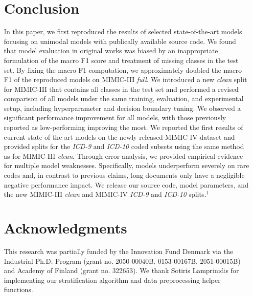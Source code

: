 {\section{Conclusion}
In this paper, we first reproduced the results of selected state-of-the-art models focusing on unimodal models with publically available source code. 
We found that model evaluation in original works was biased by an inappropriate formulation of the macro F1 score and treatment of missing classes in the test set. By fixing the macro F1 computation, we approximately doubled the macro F1 of the reproduced models on MIMIC-III \textit{full}. 
We introduced a new \textit{clean} split for MIMIC-III that contains all classes in the test set and performed a revised comparison of all models under the same training, evaluation, and experimental setup, including hyperparameter and decision boundary tuning. We observed a significant performance improvement for all models, with those previously reported as low-performing improving the most. 
We reported the first results of current state-of-the-art models on the newly released MIMIC-IV dataset \parencite{johnsonMIMICIVFreelyAccessible2023, goldbergerPhysioBankPhysioToolkitPhysioNet2000} and provided splits for the \textit{ICD-9} and \textit{ICD-10} coded subsets using the same method as for MIMIC-III \textit{clean}.
Through error analysis, we provided empirical evidence for multiple model weaknesses. Specifically, models underperform severely on rare codes 
and, in contrast to previous claims, long documents only have a negligible negative performance impact. 
We release our source code, model parameters, and the new MIMIC-III \textit{clean} and MIMIC-IV \textit{ICD-9} and \textit{ICD-10} splits.$^\text{1}$

\section*{Acknowledgments}
This research was partially funded by the Innovation Fund Denmark via the Industrial Ph.D. Program (grant no. 2050-00040B, 0153-00167B, 2051-00015B) and Academy of Finland (grant no. 322653).
We thank Sotiris Lamprinidis for implementing our stratification algorithm and data preprocessing helper functions.
   
}
